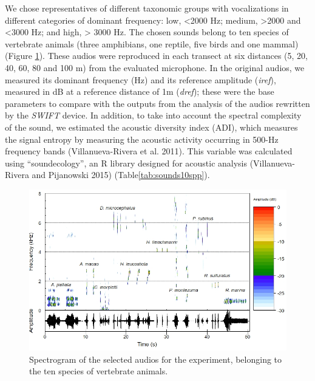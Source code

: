 \documentclass[fleqn,10pt,lineno]{wlpeerj} %
\begin{document}
We chose representatives of different taxonomic groups with
vocalizations in different categories of dominant frequency: low,
\textless2000 Hz; medium, \textgreater2000 and \textless3000 Hz; and
high, \textgreater{} 3000 Hz. The chosen sounds belong to ten species of
vertebrate animals (three amphibians, one reptile, five birds and one
mammal) (Figure \ref{fig:spectrogram}). These audios were reproduced in
each transect at six distances (5, 20, 40, 60, 80 and 100 m) from the
evaluated microphone. In the original audios, we measured its dominant
frequency (Hz) and its reference amplitude (\emph{iref}), measured in dB
at a reference distance of 1m (\emph{dref}); these were the base
parameters to compare with the outputs from the analysis of the audios
rewritten by the \emph{SWIFT} device. In addition, to take into account
the spectral complexity of the sound, we estimated the acoustic
diversity index (ADI), which measures the signal entropy by measuring
the acoustic activity occurring in 500-Hz frequency bands
(Villanueva-Rivera et al. 2011). This variable was calculated using
``soundecology'', an R library designed for acoustic analysis
(Villanueva-Rivera and Pijanowski 2015) (Table\ref{tab:sounds10spp}).

\begin{figure}

{\centering \includegraphics[width=1\linewidth]{espectrog} 

}

\caption{Spectrogram of the selected audios for the experiment, belonging to the ten species of vertebrate animals.\label{fig:spectrogram}}\label{fig:spectrogram}
\end{figure}
\end{document}
